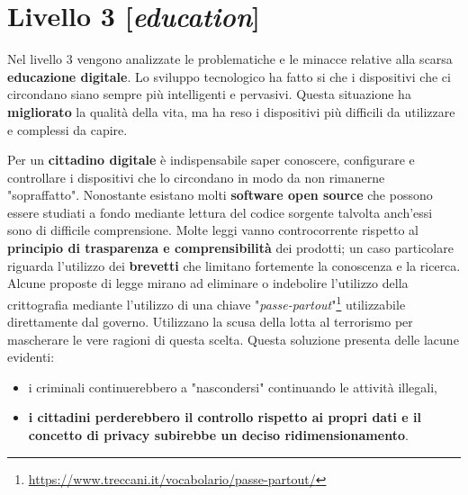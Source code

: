 \chapter{Livello 3 [\emph{education}]}
Nel livello 3 vengono analizzate le problematiche e le minacce relative alla scarsa \textbf{educazione digitale}.
 Lo sviluppo tecnologico ha fatto si che i dispositivi che ci circondano siano sempre più intelligenti e pervasivi. Questa situazione ha \textbf{migliorato} la qualità della vita, ma ha reso i dispositivi più difficili da utilizzare e complessi da capire. 

Per un \textbf{cittadino digitale} è indispensabile saper conoscere, configurare e controllare i dispositivi che lo circondano in modo da non rimanerne "sopraffatto".
Nonostante esistano molti \textbf{software open source} che possono essere studiati a fondo mediante lettura del codice sorgente talvolta anch'essi sono di difficile comprensione.
\bigbreak
Molte leggi vanno controcorrente rispetto al \textbf{principio di trasparenza e comprensibilità} dei prodotti; un caso particolare riguarda l'utilizzo dei \textbf{brevetti} che limitano fortemente la conoscenza e la ricerca.
Alcune proposte di legge mirano ad eliminare o indebolire l'utilizzo della crittografia mediante l'utilizzo di una chiave "\emph{passe-partout}"\footnote{\url{https://www.treccani.it/vocabolario/passe-partout/}} utilizzabile direttamente dal governo. Utilizzano la scusa della lotta al terrorismo per mascherare le vere ragioni di questa scelta. Questa soluzione presenta delle lacune evidenti:
\begin{itemize}
    \item i criminali continuerebbero a "nascondersi" continuando le attività illegali,
    \item \textbf{i cittadini perderebbero il controllo rispetto ai propri dati e il concetto di privacy subirebbe un deciso ridimensionamento}.
\end{itemize}

